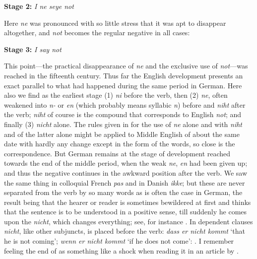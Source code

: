 \bigskip

\textbf{Stage 2:} \textit{I ne seye not}

\bigskip

Here \textit{ne} was pronounced with so little stress that it was apt to disappear altogether, and \textit{not} becomes the regular negative in all cases:

\bigskip

\textbf{Stage 3:} \textit{I say not}

\bigskip

This point---the practical disappearance of \textit{ne} and the exclusive use of \textit{not}---was reached in the fifteenth century. Thus far the English development presents an exact parallel to what had happened during the same period in German. Here also we find as the earliest stage (1) \textit{ni} before the verb, then (2) \textit{ne}, often weakened into \textit{n-} or \textit{en} (which probably means syllabic \textit{n}) before and \textit{niht} after the verb; \textit{niht} of course is the compound that corresponds to English \textit{not}; and finally (3) \textit{nicht} alone. The rules given in \citet[§310ff]{paul1894mittelhochdeutsche} for the use of \textit{ne} alone and with \textit{niht} and of the latter alone might be applied to Middle English of about the same date with hardly any change except in the form of the words, so close is the correspondence. But German remains at the stage of development reached towards the end of the middle period, when the weak \textit{ne}, \textit{en} had been given up; and thus the negative continues in the awkward position after the verb. We saw the same thing in colloquial French \textit{pas} and in Danish \textit{ikke}; but these are never separated from the verb by so many words as is often the case in German, the result being that the hearer or reader is sometimes bewildered at first and thinks that the sentence is to be understood in a positive sense, till suddenly he comes upon the \textit{nicht}, which changes everything; see, for instance . In dependent clauses \textit{nicht}, like other subjuncts, is placed before the verb: \textit{dass er nicht kommt} `that he is not coming'; \textit{wenn er nicht kommt} `if he does not come': . I remember feeling the end of  as something like a shock when reading it in an article by \citet[\href{https://archive.org/details/zeitschrift-fur-volkerpsychologie-7-8/page/153/mode/2up?view=theater}{153}]{gabelentz1870weiteres}. 

